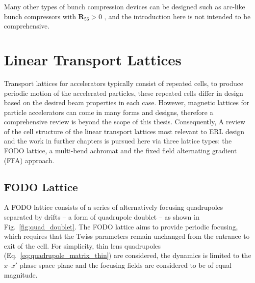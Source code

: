 \documentclass[../main.tex]{subfiles}
\begin{document}
Many other types of bunch compression devices can be designed such as arc-like bunch compressors \cite{williams2020arclike} with $\boldsymbol{R}_{56}>0$ , and the introduction here is not intended to be comprehensive. 

\section{Linear Transport Lattices}

Transport lattices for accelerators typically consist of repeated cells, to produce periodic motion of the accelerated particles, these repeated cells differ in design based on the desired beam properties in each case. However, magnetic lattices for particle accelerators can come in many forms and designs, therefore a comprehensive review is beyond the scope of this thesis. Consequently, A review of the cell structure of the linear transport lattices most relevant to ERL design and the work in further chapters is pursued here via three lattice types: the FODO lattice, a multi-bend achromat and the fixed field alternating gradient (FFA) approach. 

\subsection{FODO Lattice}
\label{sec:FODO_lattice}

A FODO lattice consists of a series of alternatively focusing quadrupoles separated by drifts -- a form of quadrupole doublet -- as shown in Fig.~\ref{fig:quad_doublet}. The FODO lattice aims to provide periodic focusing, which requires that the Twiss parameters remain unchanged from the entrance to exit of the cell. For simplicity, thin lens quadrupoles (Eq.~\ref{eq:quadrupole_matrix_thin}) are considered, the dynamics is limited to the $x$--$x'$ phase space plane and the focusing fields are considered to be of equal magnitude.
\end{document}
